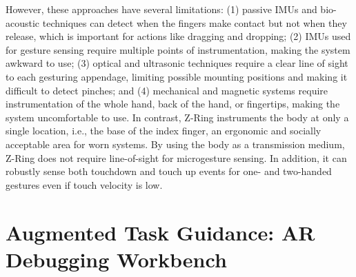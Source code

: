 \documentclass [11pt, proquest] {uwthesis}[2020/02/24]
\begin{document}
However, these approaches have several limitations: (1) passive IMUs and bio-acoustic techniques can detect when the fingers make contact  but not when they release, which is important for actions like dragging and dropping; (2) IMUs used for gesture sensing require multiple points of instrumentation, making the system awkward to use; (3) optical and ultrasonic techniques require a clear line of sight to each gesturing appendage, limiting possible mounting positions and making it difficult to detect pinches; and (4) mechanical and magnetic systems require instrumentation of the whole hand, back of the hand, or fingertips, making the system uncomfortable to use.
In contrast, Z-Ring instruments the body at only a single location, i.e., the base of the index finger, an ergonomic and socially acceptable area for worn systems. {By using the body as a transmission medium, Z-Ring does not require line-of-sight for microgesture sensing. In addition, it can robustly sense both touchdown and touch up events for one- and two-handed gestures even if touch velocity is low.}
 
 
\chapter{Augmented Task Guidance: AR Debugging Workbench}

\end{document}
